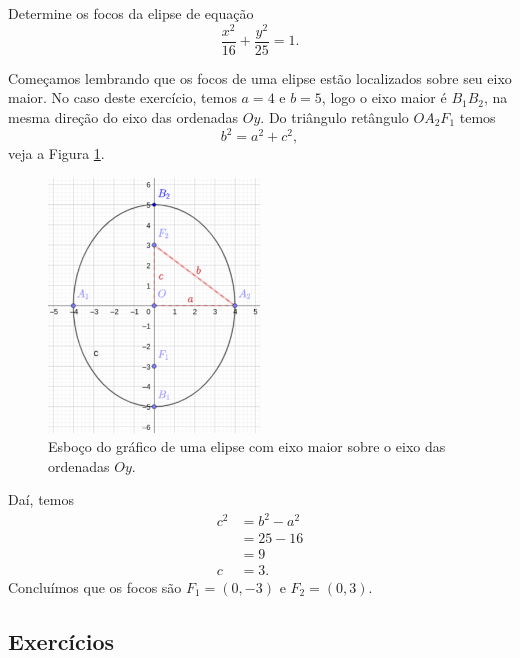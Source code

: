 \begin{exeresol}
  Determine os focos da elipse de equação
  \begin{equation}
    \frac{x^2}{16} + \frac{y^2}{25} = 1.
  \end{equation}
\end{exeresol}
\begin{resol}
  Começamos lembrando que os focos de uma elipse estão localizados sobre seu eixo maior. No caso deste exercício, temos $a=4$ e $b=5$, logo o eixo maior é $B_1B_2$, na mesma direção do eixo das ordenadas $Oy$. Do triângulo retângulo $OA_2F_1$ temos
  \begin{equation}
    b^2 = a^2 + c^2,
  \end{equation}
  veja a Figura \ref{fig:elipse_exeresol1}.

  \begin{figure}[H]
    \centering
    \includegraphics[width=0.5\textwidth]{cap_conicas/dados/fig_elipse_exeresol1/fig}
    \caption{Esboço do gráfico de uma elipse com eixo maior sobre o eixo das ordenadas $Oy$.}
    \label{fig:elipse_exeresol1}
  \end{figure}

  Daí, temos
  \begin{align}
    c^2 &= b^2 - a^2 \\
        &= 25 - 16 \\
        &= 9 \\
    c &= 3.
  \end{align}
  Concluímos que os focos são $F_1=(0,-3)$ e $F_2=(0,3)$.
\end{resol}

\subsection*{Exercícios}

